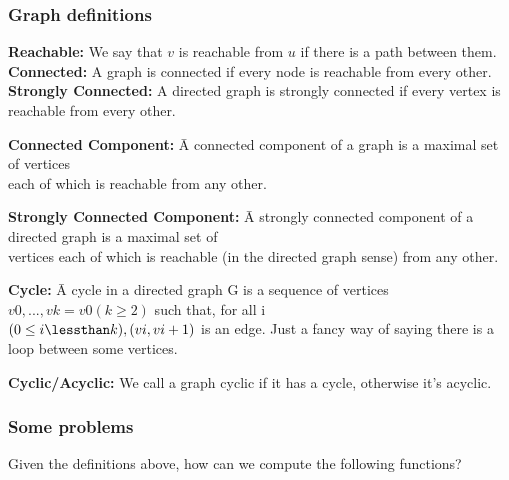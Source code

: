 \documentclass[11pt]{article}
\begin{document}
\subsubsection{Graph definitions}
\noindent\textbf{Reachable:} We say that $v$ is reachable from $u$ if there is a path between them.\\

\noindent\textbf{Connected:} A graph is connected if every node is reachable from every other.\\

\noindent\textbf{Strongly Connected:} A directed graph is strongly connected if every vertex is reachable from every other.

\begin{tabbing}
\textbf{Connected Component:} \=A connected component of a graph is a maximal set of vertices \\ \> each of which is reachable from any other.
\end{tabbing}

\begin{tabbing}
\textbf{Strongly Connected Component:} \=A strongly connected component of a directed graph is a maximal set of\\ \>vertices each of which is reachable (in the directed graph sense) from any other.\\
\end{tabbing}

\begin{tabbing}
\noindent\textbf{Cycle:} \=A cycle in a directed graph G is a sequence of vertices $v0, . . . , vk = v0 (k \geq 2)$ such that, for all i\\ \>$(0 \leq i \lessthan k),(vi, vi+1)$ is an edge. Just a fancy way of saying there is a loop between some vertices.\\
\end{tabbing}

\noindent\textbf{Cyclic/Acyclic:} We call a graph cyclic if it has a cycle, otherwise it's acyclic.

\bigskip
\subsubsection{Some problems}
Given the definitions above, how can we compute the following functions?
\end{document}
